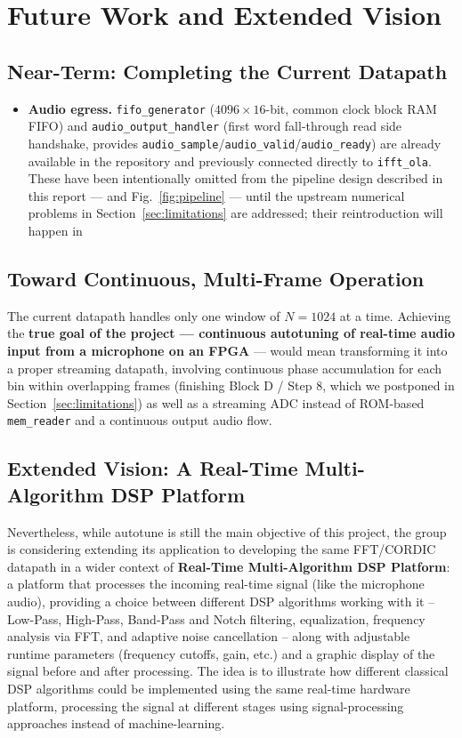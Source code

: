 \documentclass[conference,a4paper]{IEEEtran}
\begin{document}
\section{Future Work and Extended Vision}
\label{sec:future}

\subsection{Near-Term: Completing the Current Datapath}
\begin{itemize}
\item \textbf{Audio egress.} \texttt{fifo\_generator} ($4096\times16$-bit, common clock
    block RAM FIFO) and \texttt{audio\_output\_handler} (first word fall-through read
    side handshake, provides \texttt{audio\_sample}/\texttt{audio\_valid}/\texttt{audio\_ready})
    are already available in the repository and previously connected directly to
    \texttt{ifft\_ola}. These have been intentionally omitted from the pipeline design
    described in this report --- and Fig.~\ref{fig:pipeline} --- until the upstream
    numerical problems in Section~\ref{sec:limitations} are addressed; their reintroduction
    will happen in
\end{itemize}

\subsection{Toward Continuous, Multi-Frame Operation}
The current datapath handles only one window of $N = 1024$ at a time. Achieving the
\textbf{true goal of the project --- continuous autotuning of real-time audio input from
a microphone on an FPGA} --- would mean transforming it into a proper streaming datapath,
involving continuous phase accumulation for each bin within overlapping frames (finishing Block D / Step 8, which we postponed in
Section~\ref{sec:limitations}) as well as a streaming ADC instead of ROM-based \texttt{mem\_reader}
and a continuous output audio flow.

\subsection{Extended Vision: A Real-Time Multi-Algorithm DSP Platform}
Nevertheless, while autotune is still the main objective of this project, the group is considering
extending its application to developing
the same FFT/CORDIC datapath in a wider context of \textbf{Real-Time Multi-Algorithm DSP
Platform}: a platform that processes the incoming real-time signal (like the microphone
audio), providing a choice between different DSP algorithms working with it -- Low-Pass, High-Pass, Band-Pass and Notch filtering, equalization, frequency analysis via FFT, and adaptive noise
cancellation -- along with adjustable runtime parameters (frequency cutoffs, gain, etc.) and a graphic display of the signal before and after processing. The idea is to illustrate how different classical DSP algorithms could be implemented using the same real-time hardware platform, processing the signal at different stages using signal-processing approaches instead of machine-learning.
\end{document}
